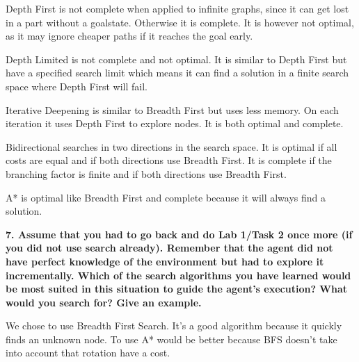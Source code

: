\documentclass[12pt,a4paper]{article}
\begin{document}
Depth First is not complete when applied to infinite graphs, since it can get lost in a part without a goalstate. Otherwise it is complete. It is however not optimal, as it may ignore cheaper paths if it reaches the goal early.

Depth Limited is not complete and not optimal. It is similar to Depth First but have a specified search limit which means it can find a solution in a finite search space where Depth First will fail. 

Iterative Deepening is similar to Breadth First but uses less memory. On each iteration it uses Depth First to explore nodes. It is both optimal and complete.

Bidirectional searches in two directions in the search space. It is optimal if all costs are equal and if both directions use Breadth First. It is complete if the branching factor is finite and if both directions use Breadth First.

A* is optimal like Breadth First and complete because it will always find a solution.


\textbf{7. Assume that you had to go back and do Lab 1/Task 2 once more (if you did not use search already). Remember that the agent did not have perfect knowledge of the environment but had to explore it incrementally. Which of the search algorithms you have learned would be most suited in this situation to guide the agent's execution? What would you search for? Give an example.}

We chose to use Breadth First Search. It's a good algorithm because it quickly finds an unknown node. To use A* would be better because BFS doesn't take into account that rotation have a cost.
\end{document}
